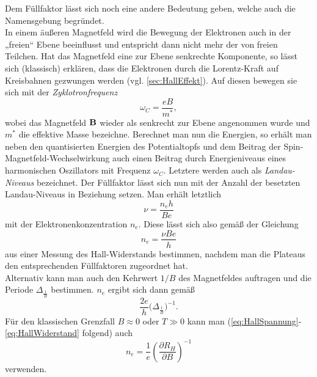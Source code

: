 Dem Füllfaktor lässt sich noch eine andere Bedeutung geben, welche auch die Namensgebung begründet.\\
In einem äußeren Magnetfeld wird die Bewegung der Elektronen auch in der „freien“ Ebene beeinflusst und entspricht dann nicht mehr der von freien Teilchen. Hat das Magnetfeld eine zur Ebene senkrechte Komponente, so lässt sich (klassisch) erklären, dass die Elektronen durch die Lorentz-Kraft auf Kreisbahnen gezwungen werden (vgl. \autoref{sec:HallEffekt}). Auf diesen bewegen sie sich mit der \emph{Zyklotronfrequenz}
$$\omega_C = \frac{eB}{m^*},$$
wobei das Magnetfeld $\textbf{B}$ wieder als senkrecht zur Ebene angenommen wurde und $m^*$ die effektive Masse bezeichne. Berechnet man nun die Energien, so erhält man neben den quantisierten Energien des Potentialtopfs und dem Beitrag der Spin-Magnetfeld-Wechselwirkung auch einen Beitrag durch Energieniveaus eines harmonischen Oszillators mit Frequenz $\omega_C$. Letztere werden auch als \emph{Landau-Niveaus} bezeichnet. Der Füllfaktor lässt sich nun mit der Anzahl der besetzten Landau-Niveaus in Beziehung setzen. Man erhält letztlich
$$\nu = \frac{n_e h}{B e}$$
mit der Elektronenkonzentration $n_e$. Diese lässt sich also gemäß der Gleichung
\begin{equation}\label{eq:EK1}
	n_e = \frac{\nu B e}{h}
\end{equation}
aus einer Messung des Hall-Widerstands bestimmen, nachdem man die Plateaus den entsprechenden Füllfaktoren zugeordnet hat.\\
Alternativ kann man auch den Kehrwert $1/B$ des Magnetfeldes auftragen und die Periode $\Delta_{\frac{1}{B}}$ bestimmen. $n_e$ ergibt sich dann gemäß
\begin{equation}\label{eq:EK2}
	\frac{2e}{h}\big(\Delta_{\frac{1}{B}}\big)^{-1}.
\end{equation}
Für den klassischen Grenzfall $B\approx 0$ oder $T\gg 0$ kann man (\eqref{eq:HallSpannung}-\eqref{eq:HallWiderstand} folgend) auch 
\begin{equation}\label{eq:EK3}
	n_e = \frac{1}{e}\left(\frac{\partial R_H}{\partial B}\right)^{-1}
\end{equation}
verwenden.

\nocite{WIKI-FG}
\nocite{WIKI-HE}
\nocite{QHE}
